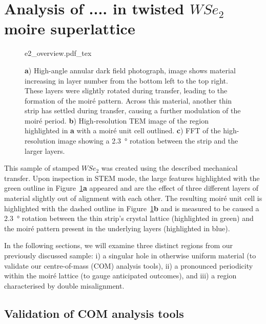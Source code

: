 %
\section{Analysis of .... in twisted $WSe_2$ moire superlattice}

\begin{figure}
    \centering
    \def\svgwidth{.95\linewidth}
    {e2_overview.pdf_tex}
    \caption{\textbf{a}) High-angle annular dark field photograph, image shows material increasing in layer number from the bottom left to the top right. These layers were slightly rotated during transfer, leading to the formation of the moiré pattern. Across this material, another thin strip has settled during transfer, causing a further modulation of the moiré period. \textbf{b}) High-resolution TEM image of the region highlighted in \textbf{a} with a moiré unit cell outlined. \textbf{c}) FFT of the high-resolution image showing a \SI{2.3}{\degree} rotation between the strip and the larger layers.}
    \label{fig:dub_moire}
\end{figure}

This sample of stamped $WSe_2$ was created using the described mechanical transfer. Upon inspection in STEM mode, the large features highlighted with the green outline in Figure~\ref{fig:dub_moire}\textbf{a} appeared and are the effect of three different layers of material slightly out of alignment with each other. 
%
The resulting moiré unit cell is highlighted with the dashed outline in Figure~\ref{fig:dub_moire}\textbf{b} and is measured to be caused a \SI{2.3}{\degree} rotation between the thin strip's crystal lattice (highlighted in green) and the moiré pattern present in the underlying layers (highlighted in blue).


In the following sections, we will examine three distinct regions from our previously discussed sample: i) a singular hole in otherwise uniform material (to validate our centre-of-mass (COM) analysis tools), ii) a pronounced periodicity within the moiré lattice (to gauge anticipated outcomes), and  iii) a region characterised by double misalignment.

\subsection{Validation of COM analysis tools}

